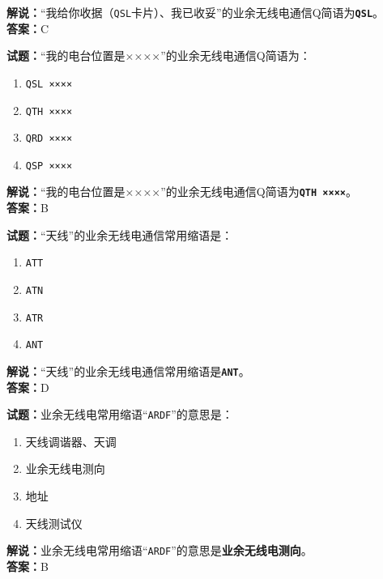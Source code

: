 \documentclass{ctexbook}
\begin{document}
\noindent\textbf{解说：}“我给你收据（\texttt{QSL}卡片）、我已收妥”的业余无线电通信Q简语为\texttt{\textbf{QSL}}。\\\noindent\textbf{答案：}C

\vspace{\baselineskip}

\noindent\textbf{试题：}“我的电台位置是××××”的业余无线电通信Q简语为：

\begin{enumerate}[leftmargin=3em]
  \item \texttt{QSL ××××}
  \item \texttt{QTH ××××}
  \item \texttt{QRD ××××}
  \item \texttt{QSP ××××}
\end{enumerate}

\noindent\textbf{解说：}“我的电台位置是××××”的业余无线电通信Q简语为\texttt{\textbf{QTH ××××}}。\\\noindent\textbf{答案：}B

\vspace{\baselineskip}

\noindent\textbf{试题：}“天线”的业余无线电通信常用缩语是：

\begin{enumerate}[leftmargin=3em]
  \item \texttt{ATT}
  \item \texttt{ATN}
  \item \texttt{ATR}
  \item \texttt{ANT}
\end{enumerate}

\noindent\textbf{解说：}“天线”的业余无线电通信常用缩语是\texttt{\textbf{ANT}}。\\\noindent\textbf{答案：}D

\vspace{\baselineskip}

\noindent\textbf{试题：}业余无线电常用缩语“\texttt{ARDF}”的意思是：

\begin{enumerate}[leftmargin=3em]
  \item 天线调谐器、天调
  \item 业余无线电测向
  \item 地址
  \item 天线测试仪
\end{enumerate}

\noindent\textbf{解说：}业余无线电常用缩语“\texttt{ARDF}”的意思是\textbf{业余无线电测向}。\\\noindent\textbf{答案：}B
\end{document}
